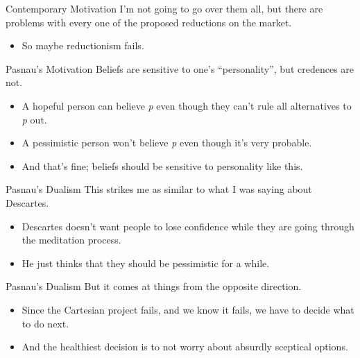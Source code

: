 \documentclass[
  17pt,
  letterpaper,
  ignorenonframetext,
  aspectratio=169,
]{beamer}
\providecommand{\tightlist}{%
  \setlength{\itemsep}{0pt}\setlength{\parskip}{0pt}}\usepackage{longtable,booktabs,array}
\begin{document}
\begin{frame}{Contemporary Motivation}
\protect\hypertarget{contemporary-motivation-1}{}
I'm not going to go over them all, but there are problems with every one
of the proposed reductions on the market.

\begin{itemize}[<+->]
\tightlist
\item
  So maybe reductionism fails.
\end{itemize}
\end{frame}

\begin{frame}{Pasnau's Motivation}
\protect\hypertarget{pasnaus-motivation}{}
Beliefs are sensitive to one's ``personality'', but credences are not.

\begin{itemize}[<+->]
\tightlist
\item
  A hopeful person can believe \emph{p} even though they can't rule all
  alternatives to \emph{p} out.
\item
  A pessimistic person won't believe \emph{p} even though it's very
  probable.
\item
  And that's fine; beliefs should be sensitive to personality like this.
\end{itemize}
\end{frame}

\begin{frame}{Pasnau's Dualism}
\protect\hypertarget{pasnaus-dualism}{}
This strikes me as similar to what I was saying about Descartes.

\begin{itemize}[<+->]
\tightlist
\item
  Descartes doesn't want people to lose confidence while they are going
  through the meditation process.
\item
  He just thinks that they should be pessimistic for a while.
\end{itemize}
\end{frame}

\begin{frame}{Pasnau's Dualism}
\protect\hypertarget{pasnaus-dualism-1}{}
But it comes at things from the opposite direction.

\begin{itemize}[<+->]
\tightlist
\item
  Since the Cartesian project fails, and we know it fails, we have to
  decide what to do next.
\item
  And the healthiest decision is to not worry about absurdly sceptical
  options.
\end{itemize}
\end{frame}
\end{document}
